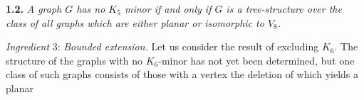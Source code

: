 \textbf{1.2.} \textit{A graph $G$ has no $K_5$ minor if and only if $G$ is a tree-structure over the class of all graphs which are either planar or isomorphic to $V_8$.}

\textit{Ingredient} 3: \textit{Bounded extension.} Let us consider the result of excluding $K_6$. The structure of the graphs with no $K_6$-minor has not yet been determined, but one class of such graphs consists of those with a vertex the deletion of which yields a planar
